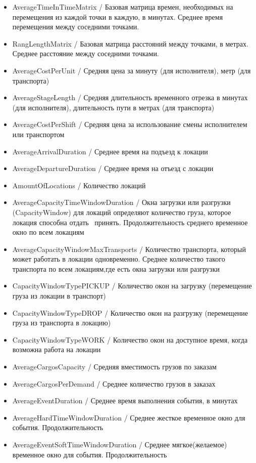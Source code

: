 \documentclass[specification,annotation]{itmo-student-thesis}
\begin{document}
\begin{itemize}
	\item AverageTimeInTimeMatrix / Базовая матрица времен, необходимых на перемещения из каждой точки в каждую, в минутах. Среднее время перемещения между соседними точками.
	\item RangLengthMatrix / Базовая матрица расстояний между точками, в метрах. Среднее расстояние между соседними точками.
	\item AverageCostPerUnit / Средняя цена за минуту (для исполнителя), метр (для транспорта)
	\item AverageStageLength / Средняя длительность временного отрезка в минутах (для исполнителя), длительность пути в метрах (для транспорта)
	\item AverageCostPerShift / Средняя цена за использование смены исполнителем или транспортом
	\item AverageArrivalDuration / Среднее время на подъезд к локации
	\item AverageDepartureDuration / Среднее время на отъезд с локации
	\item AmountOfLocations / Количество локаций
	\item AverageCapacityTimeWindowDuration / Окна загрузки или разгрузки (CapacityWindow) для локаций определяют количество груза, которое локация способна отдать \ принять. Продолжительность среднего временное окно по всем локациям
	\item AverageCapacityWindowMaxTransports / Количество транспорта, который может работать в локации одновременно. Среднее количество такого транспорта по всем локациям,где есть окна загрузки или разгрузки
	\item CapacityWindowTypePICKUP / Количество окон на загрузку (перемещение груза из локации в транспорт)
	\item CapacityWindowTypeDROP / Количество окон на разгрузку (перемещение груза из транспорта в локацию)
	\item CapacityWindowTypeWORK / Количество окон на доступное время, когда возможна работа на локации
	\item AverageCargosCapacity / Средняя вместимость грузов по заказам
	\item AverageCargosPerDemand / Среднее количество грузов в заказах
	\item AverageEventDuration / Среднее время выполнения события, в минутах
	\item AverageHardTimeWindowDuration / Среднее жесткое временное окно для события. Продолжительность
	\item AverageEventSoftTimeWindowDuration / Среднее мягкое(желаемое) временное окно для события. Продолжительность

\end{itemize}
\end{document}
